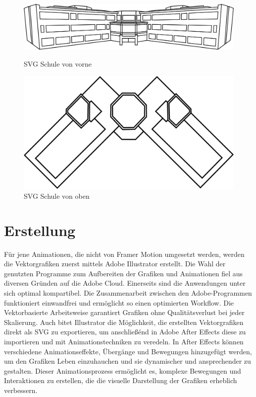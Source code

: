 \begin{figure}
   \begin{minipage}[b]{.4\linewidth} 
      \includegraphics[width=\linewidth]{pics/schule vorne.png}
      \caption{SVG Schule von vorne}
      \label{fig:impl:schule:vorne}
   \end{minipage}
   \hspace{.05\linewidth}
   \begin{minipage}[b]{.4\linewidth}
      \includegraphics[width=\linewidth]{pics/schule.png}
      \caption{SVG Schule von oben}
      \label{fig:impl:schule:oben}
   \end{minipage}
\end{figure}


\section{Erstellung} \label{sec:animationen:Erstellen}

Für jene Animationen, die nicht von Framer Motion umgesetzt werden, werden die Vektorgrafiken zuerst mittels Adobe Illustrator erstellt. Die Wahl der genutzten Programme zum Aufbereiten der Grafiken und Animationen fiel aus diversen Gründen
auf die Adobe Cloud. Einerseits sind die Anwendungen unter sich optimal kompartibel. Die Zusammenarbeit zwischen den Adobe-Programmen funktioniert 
einwandfrei und ermöglicht so einen optimierten Workflow. Die Vektorbasierte Arbeitsweise garantiert Grafiken ohne Qualitätsverlust bei jeder Skalierung. Auch bitet Illustrator die Möglichkeit, die erstellten Vektorgrafiken direkt als SVG zu exportieren, um anschließénd
in Adobe After Effects diese zu importieren und mit Animationstechniken zu veredeln. In After Effects können verschiedene Animationseffekte, 
Übergänge und Bewegungen hinzugefügt werden, um den Grafiken Leben einzuhauchen und sie dynamischer und ansprechender zu gestalten. 
Dieser Animationsprozess ermöglicht es, komplexe Bewegungen und Interaktionen zu erstellen, die die visuelle Darstellung der Grafiken 
erheblich verbessern.

